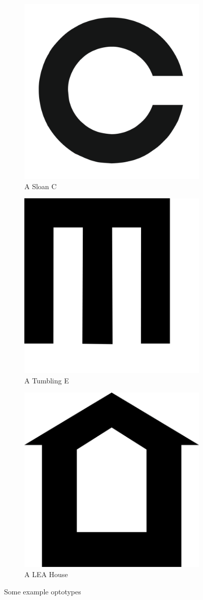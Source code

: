 \documentclass[12pt,a4paper,notitlepage]{report}
\begin{document}
\begin{figure}[ht!]
\centering
\begin{subfigure}{.3\textwidth}
  \centering
  \includegraphics[width=.4\linewidth]{images/landholt_c_optotype.png}
  \caption{A Sloan C}
  \label{fig:landholt_c1}
\end{subfigure}%
\begin{subfigure}{.3\textwidth}
  \centering
  \includegraphics[width=.4\linewidth]{images/tumbling_e_optotype.png}
  \caption{A Tumbling E}
  \label{fig:tumbling_e1}
\end{subfigure}
\begin{subfigure}{.3\textwidth}
  \centering
  \includegraphics[width=.4\linewidth]{images/lea_optotype.png}
  \caption{A LEA House}
  \label{fig:lea1}
\end{subfigure}
\caption{Some example optotypes}
\label{fig:optotypes_example1}
\end{figure}
\end{document}
